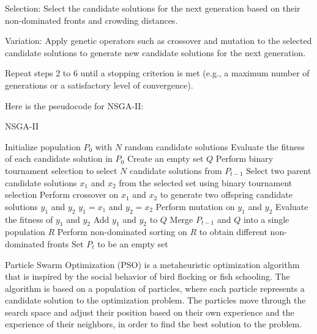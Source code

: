 Selection: Select the candidate solutions for the next generation based on their non-dominated fronts and crowding distances.

Variation: Apply genetic operators such as crossover and mutation to the selected candidate solutions to generate new candidate solutions for the next generation.

Repeat steps 2 to 6 until a stopping criterion is met (e.g., a maximum number of generations or a satisfactory level of convergence).

Here is the pseudocode for NSGA-II:

\begin{algorithm}[H]
\caption{NSGA-II}\label{nsga2}
\begin{algorithmic}[1]
\State Initialize population $P_0$ with $N$ random candidate solutions
\State Evaluate the fitness of each candidate solution in $P_0$
\State Create an empty set $Q$
\State Perform binary tournament selection to select $N$ candidate solutions from $P_{t-1}$
\State Select two parent candidate solutions $x_1$ and $x_2$ from the selected set using binary tournament selection
\State Perform crossover on $x_1$ and $x_2$ to generate two offspring candidate solutions $y_1$ and $y_2$
\Else
\State $y_1 = x_1$ and $y_2 = x_2$
\EndIf
{}
\State Perform mutation on $y_1$ and $y_2$
\EndIf
\State Evaluate the fitness of $y_1$ and $y_2$
\State Add $y_1$ and $y_2$ to $Q$
\EndFor
\State Merge $P_{t-1}$ and $Q$ into a single population $R$
\State Perform non-dominated sorting on $R$ to obtain different non-dominated fronts
\State Set $P_t$ to be an empty set
\State
\end{algorithmic}
\end{algorithm}

Particle Swarm Optimization (PSO) is a metaheuristic optimization algorithm that is inspired by the social behavior of bird flocking or fish schooling. The algorithm is based on a population of particles, where each particle represents a candidate solution to the optimization problem. The particles move through the search space and adjust their position based on their own experience and the experience of their neighbors, in order to find the best solution to the problem.

